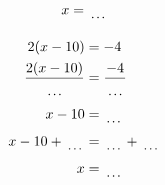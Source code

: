 \documentclass[12pt]{article}
\newcounter{minipagecount}
\begin{document}
\begin{multicols}{2}
\begin{minipage}[t]{0.45\textwidth}
\begin{align*}
        x &= \dotuline{\hspace{5mm}}\\
    \end{align*}
\end{minipage} %
\noindent{(\theminipagecount)}\hspace{0.1mm} %
\begin{minipage}[t]{0.45\textwidth} %
    \vspace{-26pt}  %
    \raggedright %
    \begin{align*} %
        2(x - 10) &= -4\\
        \frac{2(x-10)}{\dotuline{\hspace{5mm}}} &= \frac{-4}{\dotuline{\hspace{5mm}}}\\
        x - 10 &= \dotuline{\hspace{5mm}}\\
        x - 10 + \dotuline{\hspace{5mm}} &= \dotuline{\hspace{5mm}} + \dotuline{\hspace{5mm}}\\
        x &= \dotuline{\hspace{5mm}}\\
    \end{align*}
\end{minipage} %
\noindent{(\theminipagecount)}\hspace{0.1mm} %
\begin{minipage}[t]{0.45\textwidth} %
    \vspace{-26pt}  %

\end{minipage}
\end{multicols}
\end{document}
